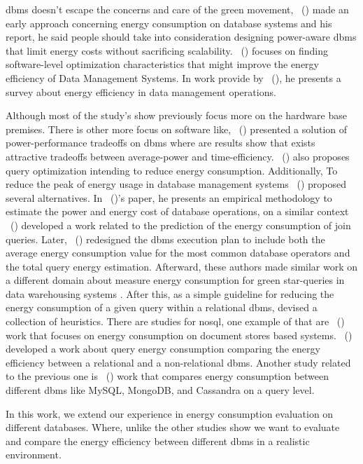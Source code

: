 \gls{dbms} doesn't escape the concerns and care of the green movement, \citeauthor{agrawal2008claremont}~(\citeyear{agrawal2008claremont}) made an early approach concerning energy consumption on database systems and his report, he said people should take into consideration designing power-aware \gls{dbms} that limit energy costs without sacrificing scalability.
\citeauthor{HarizopoulosEnergy}~(\citeyear{HarizopoulosEnergy}) focuses on finding software-level optimization characteristics that might improve the energy efficiency of Data Management Systems. 
In work provide by \citeauthor{wang2011survey}~(\citeyear{wang2011survey}), he presents a survey about energy efficiency in data management operations.

Although most of the study's show previously focus more on the hardware base premises. There is other more focus on software like,
\citeauthor{5447840}~(\citeyear{5447840}) presented a solution of power-performance tradeoffs on \gls{dbms} where are results show that exists attractive tradeoffs between average-power and time-efficiency. \citeauthor{xupet}~(\citeyear{xupet}) also proposes query optimization intending to reduce energy consumption. Additionally, To reduce the peak of energy usage in database management systems \citeauthor{KunjirPeakPower}~(\citeyear{KunjirPeakPower}) proposed several alternatives. In \citeauthor{RODRIGUEZMARTINEZ2011112}~(\citeyear{RODRIGUEZMARTINEZ2011112})'s paper, he presents an empirical methodology to estimate the power and energy cost of database operations, on a similar context \citeauthor{6738985}~(\citeyear{6738985})  developed a work related to the prediction of the energy consumption of join queries. Later, \citeauthor{gonçalvesbelo}~(\citeyear{gonçalvesbelo}) redesigned the \gls{dbms} execution plan to include both the average energy consumption value for the most common database operators and the total query energy estimation. Afterward, these authors made similar work on a different domain about measure energy consumption for green star-queries in data warehousing systems \cite{7396507}. After this, as a simple guideline for reducing the energy consumption of a given query within a relational \gls{dbms},  \cite{guimaraes2016some} devised a collection of heuristics. There are studies for \gls{nosql}, one example of that are \citeauthor{duarte2017evaluating}~(\citeyear{duarte2017evaluating}) work that focuses on energy consumption on document stores based systems. \citeauthor{Authenticus:P-00P-QKR}~(\citeyear{Authenticus:P-00P-QKR}) developed a work about query energy consumption comparing the energy efficiency between a relational and a non-relational \gls{dbms}. Another study related to the previous one is \citeauthor{mahajan2016energy}~(\citeyear{mahajan2016energy}) work that compares energy consumption between different \gls{dbms} like MySQL, MongoDB, and Cassandra on a query level.



In this work, we extend our experience in energy consumption evaluation on different databases. Where, unlike the other studies show we want to evaluate and compare the energy efficiency between different \gls{dbms} in a realistic environment.







